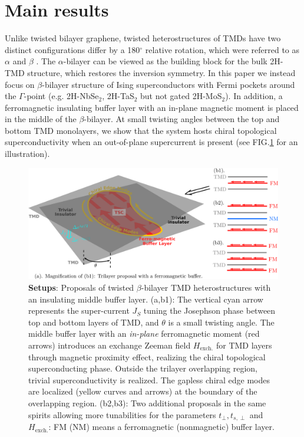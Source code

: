 \section{Main results}
Unlike twisted bilayer graphene, twisted heterostructures of TMDs have two distinct configurations differ by a 180$^\circ$ relative rotation, which were referred to as $\alpha$ and $\beta$  \cite{xian2019multiflat}. The $\alpha$-bilayer can be viewed as the building block for the bulk 2H-TMD structure, which restores the inversion symmetry. In this paper we instead focus on $\beta$-bilayer structure of Ising superconductors with Fermi pockets around the $\Gamma$-point (e.g. 2H-NbSe$_2$, 2H-TaS$_2$ but not gated 2H-MoS$_2$). In addition, a ferromagnetic insulating buffer layer with an in-plane magnetic moment is placed in the middle of the $\beta$-bilayer. At small twisting angles between the top and bottom TMD monolayers, we show that the system hosts chiral topological superconductivity when an out-of-plane supercurrent is present (see FIG.\ref{fig: proposals} for an illustration).
\begin{figure}
	\centering
	\includegraphics[width=1.0\textwidth]{contents/Ising_Top/figures/pdf_files/Magnetic_Buffer_Layer.combo.pdf}
	\caption{{\bf Setups}: Proposals of twisted $\beta$-bilayer TMD heterostructures with an insulating middle buffer layer. (a,b1): The vertical cyan arrow represents the super-current $J_S$ tuning the Josephson phase between top and bottom layers of TMD, and $\theta$ is a small twisting angle. The middle buffer layer with an \emph{in-plane} ferromagnetic moment (red arrows)  introduces an exchange Zeeman field $H_{\text{exch.}}$ for TMD layers through magnetic proximity effect, realizing the chiral topological superconducting phase. Outside the trilayer overlapping region, trivial superconductivity is realized. The gapless chiral edge modes are localized (yellow curves and arrows) at the boundary of the overlapping region. (b2,b3): Two additional proposals in the same spirits allowing more tunabilities for the parameters $t_\perp,t_{s,\perp}$ and $H_{\text{exch.}}$: FM (NM) means a ferromagnetic (nonmagnetic) buffer layer.}
	\label{fig: proposals}
\end{figure}

